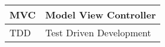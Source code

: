 

\begin{longtable}{p{90pt}l}
\hline MVC      & Model View Controller \\
\hline TDD      & Test Driven Development \\
\hline
\end{longtable}

